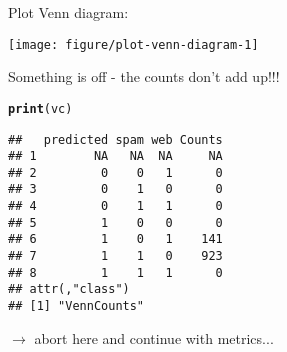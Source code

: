 \documentclass{article}\usepackage[]{graphicx}\usepackage[]{color}
\makeatletter
\newcommand{\hlstd}[1]{\textcolor[rgb]{0.345,0.345,0.345}{#1}}%
\newcommand{\hlkwd}[1]{\textcolor[rgb]{0.737,0.353,0.396}{\textbf{#1}}}%
\newenvironment{kframe}{%
 \def\at@end@of@kframe{}%
 \ifinner\ifhmode%
  \def\at@end@of@kframe{\end{minipage}}%
  \begin{minipage}{\columnwidth}%
 \fi\fi%
 \def\FrameCommand##1{\hskip\@totalleftmargin \hskip-\fboxsep
 \colorbox{shadecolor}{##1}\hskip-\fboxsep
     \hskip-\linewidth \hskip-\@totalleftmargin \hskip\columnwidth}%
 \MakeFramed {\advance\hsize-\width
   \@totalleftmargin\z@ \linewidth\hsize
   \@setminipage}}%
 {\par\unskip\endMakeFramed%
 \at@end@of@kframe}
\newenvironment{knitrout}{}{} %
\makeatother
\begin{document}
Plot Venn diagram:
\begin{knitrout}
\color{fgcolor}

{\centering \texttt{[image: figure/plot-venn-diagram-1]} 

}



\end{knitrout}

Something is off - the counts don't add up!!!
\begin{knitrout}
\color{fgcolor}\begin{kframe}
\begin{alltt}
\hlkwd{print}\hlstd{(vc)}
\end{alltt}
\begin{verbatim}
##   predicted spam web Counts
## 1        NA   NA  NA     NA
## 2         0    0   1      0
## 3         0    1   0      0
## 4         0    1   1      0
## 5         1    0   0      0
## 6         1    0   1    141
## 7         1    1   0    923
## 8         1    1   1      0
## attr(,"class")
## [1] "VennCounts"
\end{verbatim}
\end{kframe}
\end{knitrout}

$\rightarrow$ abort here and continue with metrics...
\end{document}
